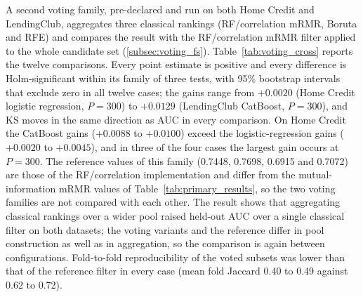 \documentclass[final,5p,twocolumn]{elsarticle}
\begin{document}
A second voting family, pre-declared and run on both Home Credit and LendingClub, aggregates three classical rankings (RF/correlation mRMR, Boruta and RFE) and compares the result with the RF/correlation mRMR filter applied to the whole candidate set (\ref{subsec:voting_fs}). Table~\ref{tab:voting_cross} reports the twelve comparisons. Every point estimate is positive and every difference is Holm-significant within its family of three tests, with 95\% bootstrap intervals that exclude zero in all twelve cases; the gains range from $+0.0020$ (Home Credit logistic regression, $P=300$) to $+0.0129$ (LendingClub CatBoost, $P=300$), and KS moves in the same direction as AUC in every comparison. On Home Credit the CatBoost gains ($+0.0088$ to $+0.0100$) exceed the logistic-regression gains ($+0.0020$ to $+0.0045$), and in three of the four cases the largest gain occurs at $P=300$. The reference values of this family (0.7448, 0.7698, 0.6915 and 0.7072) are those of the RF/correlation implementation and differ from the mutual-information mRMR values of Table~\ref{tab:primary_results}, so the two voting families are not compared with each other. The result shows that aggregating classical rankings over a wider pool raised held-out AUC over a single classical filter on both datasets; the voting variants and the reference differ in pool construction as well as in aggregation, so the comparison is again between configurations. Fold-to-fold reproducibility of the voted subsets was lower than that of the reference filter in every case (mean fold Jaccard 0.40 to 0.49 against 0.62 to 0.72).
\end{document}
